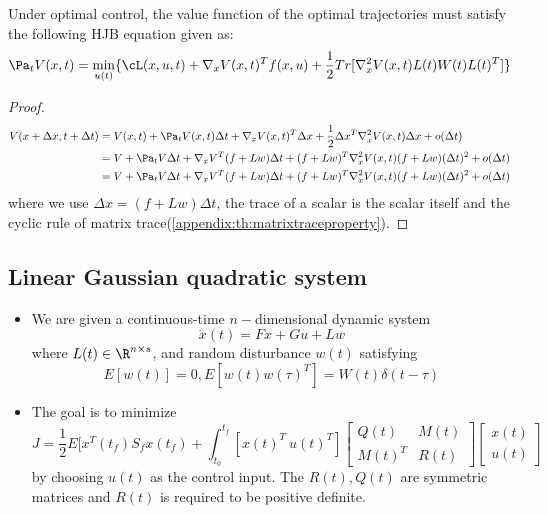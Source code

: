\begin{refsection}
\begin{theorem}\label{ch:stochastic-optimal-control:HJBequaiton}
Under optimal control, the value function of the optimal trajectories must satisfy the following HJB equation given as:
$$\Pa_t V(x,t) = \min_{u(t)} \{\cL(x,u,t) + \nabla_x V(x,t)^T f(x,u) + \frac{1}{2} Tr[\nabla_x^2 V(x,t) L(t)W(t)L(t)^T]  \}$$ 
\end{theorem}
\begin{proof}
\begin{align*}
V(x+\Delta x, t + \Delta t) &= V(x,t) + \Pa_t V(x,t) \Delta t + \nabla_x V(x,t)^T \Delta x + \frac{1}{2} \Delta x^T \nabla^2_x V(x,t) \Delta x + o(\Delta t) \\
&=V + \Pa_t V \Delta t + \nabla_x V^T (f + Lw)\Delta t + (f + Lw)^T\nabla^2_x V(x,t)(f + Lw)(\Delta t)^2 + o(\Delta t) \\
&=V + \Pa_t V \Delta t + \nabla_x V^T (f + Lw)\Delta t + (f + Lw)^T\nabla^2_x V(x,t)(f + Lw)(\Delta t)^2 + o(\Delta t)
\end{align*}
where we use $\Delta x = (f + Lw)\Delta t $, the trace of a scalar is the scalar itself and the cyclic rule of matrix trace(\autoref{appendix:th:matrixtraceproperty}).
\end{proof}



\subsection{Linear Gaussian quadratic system}

\begin{definition}\cite[421]{stengel2012optimal}\hfill
	\begin{itemize}
		\item We are given a continuous-time $n-$dimensional dynamic system
		$$\dot{x}(t)  =  Fx + Gu + Lw$$
		where $L(t)\in \R^{n\times s}$, and random disturbance $w(t)$ satisfying 
		$$E[w(t)] = 0, E[w(t)w(\tau)^T] = W(t)\delta(t-\tau)$$
		\item The goal is to minimize
		$$J = \frac{1}{2}E[x^T(t_f)S_fx(t_f) + \int_{t_0}^{t_f}[x(t)^T ~ u(t)^T]\begin{bmatrix}
		Q(t) & M(t)\\
		M(t)^T & R(t)
		\end{bmatrix} \begin{bmatrix}
		x(t)\\
		u(t)
		\end{bmatrix}$$
		by choosing $u(t)$ as the control input. The $R(t),Q(t)$ are symmetric matrices and $R(t)$ is required to be positive definite. 
	\end{itemize}
\end{definition}



\end{refsection}
